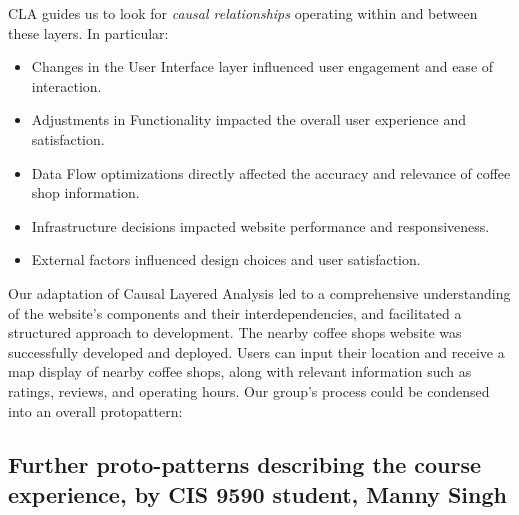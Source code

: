 \documentclass[acmlarge,timestamp]{acmart}
\begin{document}
CLA guides us to look for \emph{causal relationships} operating within
and between these layers.  In particular:
\begin{itemize}
  \item Changes in the User Interface layer influenced user engagement
    and ease of interaction.
  \item Adjustments in Functionality impacted the overall user
  experience and satisfaction.
  \item Data Flow optimizations directly affected the accuracy and
    relevance of coffee shop information.
  \item Infrastructure decisions impacted website performance and
    responsiveness.
  \item External factors influenced design choices and user
    satisfaction.
\end{itemize}

Our adaptation of Causal Layered Analysis led to a comprehensive
understanding of the website's components and their interdependencies,
and facilitated a structured approach to development.  The nearby
coffee shops website was successfully developed and deployed.  Users
can input their location and receive a map display of nearby coffee
shops, along with relevant information such as ratings, reviews, and
operating hours.  Our group’s process could be condensed into an
overall protopattern:








\subsection{Further proto-patterns describing the course experience, by CIS 9590 student, Manny Singh}\label{sec:manny-protopatterns}
\end{document}
